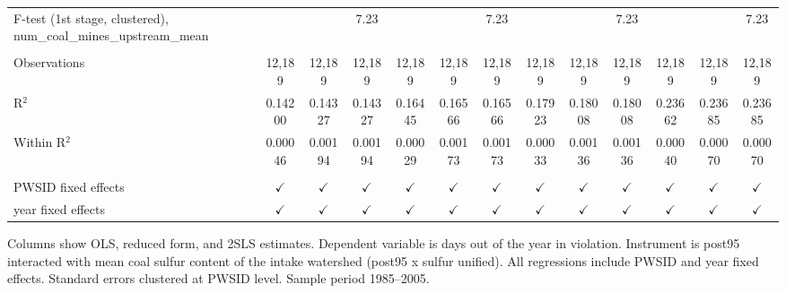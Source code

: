 \begin{table}[htbp]
\begin{adjustbox}{width = \textwidth, center}
\begin{tabular}{lcccccccccccc}
         F-test (1st stage, clustered), num\_coal\_mines\_upstream\_mean     &               &               & 7.23          &               &               & 7.23          &               &               & 7.23          &               &               & 7.23\\  
         
          \\
         
         Observations                                                        & 12,189        & 12,189        & 12,189        & 12,189        & 12,189        & 12,189        & 12,189        & 12,189        & 12,189        & 12,189        & 12,189        & 12,189\\  
         R$^2$                                                               & 0.14200       & 0.14327       & 0.14327       & 0.16445       & 0.16566       & 0.16566       & 0.17923       & 0.18008       & 0.18008       & 0.23662       & 0.23685       & 0.23685\\  
         Within R$^2$                                                        & 0.00046       & 0.00194       & 0.00194       & 0.00029       & 0.00173       & 0.00173       & 0.00033       & 0.00136       & 0.00136       & 0.00040       & 0.00070       & 0.00070\\  
         
          \\
         
         PWSID fixed effects                                                 & $\checkmark$  & $\checkmark$  & $\checkmark$  & $\checkmark$  & $\checkmark$  & $\checkmark$  & $\checkmark$  & $\checkmark$  & $\checkmark$  & $\checkmark$  & $\checkmark$  & $\checkmark$\\   
         year fixed effects                                                  & $\checkmark$  & $\checkmark$  & $\checkmark$  & $\checkmark$  & $\checkmark$  & $\checkmark$  & $\checkmark$  & $\checkmark$  & $\checkmark$  & $\checkmark$  & $\checkmark$  & $\checkmark$\\   
         
         \bottomrule
         
      \end{tabular}
      
      
      
   \end{adjustbox}
      {\tiny\linespread{1}\selectfont \par \raggedright 
   Columns show OLS, reduced form, and 2SLS estimates. Dependent variable is days out of the year in violation. Instrument is post95 interacted with mean coal sulfur content of the intake watershed (post95 x sulfur unified). All regressions include PWSID and year fixed effects. Standard errors clustered at PWSID level. Sample period 1985--2005.}
   
\end{table}


